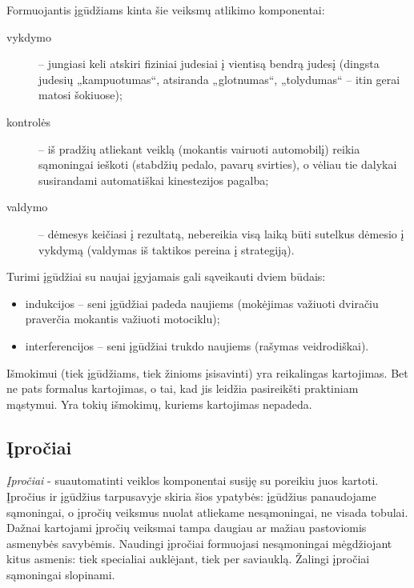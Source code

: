 Formuojantis įgūdžiams kinta šie veiksmų atlikimo komponentai:
\begin{description}
  \item[vykdymo] – jungiasi keli atskiri fiziniai judesiai į vientisą 
    bendrą judesį (dingsta judesių „kampuotumas“, atsiranda „glotnumas“, 
    „tolydumas“ – itin gerai matosi šokiuose);
  \item[kontrolės] – iš pradžių atliekant veiklą (mokantis vairuoti 
    automobilį) reikia sąmoningai ieškoti (stabdžių pedalo, pavarų 
    svirties), o vėliau tie dalykai susirandami automatiškai
    kinestezijos pagalba;
  \item[valdymo] – dėmesys keičiasi į rezultatą, nebereikia visą laiką
    būti sutelkus dėmesio į vykdymą (valdymas iš taktikos pereina į
    strategiją).
\end{description}

Turimi įgūdžiai su naujai įgyjamais gali sąveikauti dviem būdais:
\begin{itemize}
  \item indukcijos – seni įgūdžiai padeda naujiems (mokėjimas važiuoti
    dviračiu praverčia mokantis važiuoti motociklu);
  \item interferencijos – seni įgūdžiai trukdo naujiems (rašymas 
    veidrodiškai).
\end{itemize}


Išmokimui (tiek įgūdžiams, tiek žinioms įsisavinti) yra reikalingas 
kartojimas. Bet ne pats formalus kartojimas, o tai, kad jis leidžia
pasireikšti praktiniam mąstymui. Yra tokių išmokimų, kuriems kartojimas
nepadeda.

\subsection{Įpročiai}

\emph{Įpročiai} - suautomatinti veiklos komponentai susiję su poreikiu juos
kartoti. Įpročius ir įgūdžius tarpusavyje skiria šios ypatybės: įgūdžius 
panaudojame sąmoningai, o įpročių veiksmus nuolat atliekame nesąmoningai, ne
visada tobulai. Dažnai kartojami įpročių veiksmai tampa daugiau ar mažiau
pastoviomis asmenybės savybėmis. Naudingi įpročiai formuojasi nesąmoningai
mėgdžiojant kitus asmenis: tiek specialiai auklėjant, tiek per saviauklą.
Žalingi įpročiai sąmoningai slopinami.

